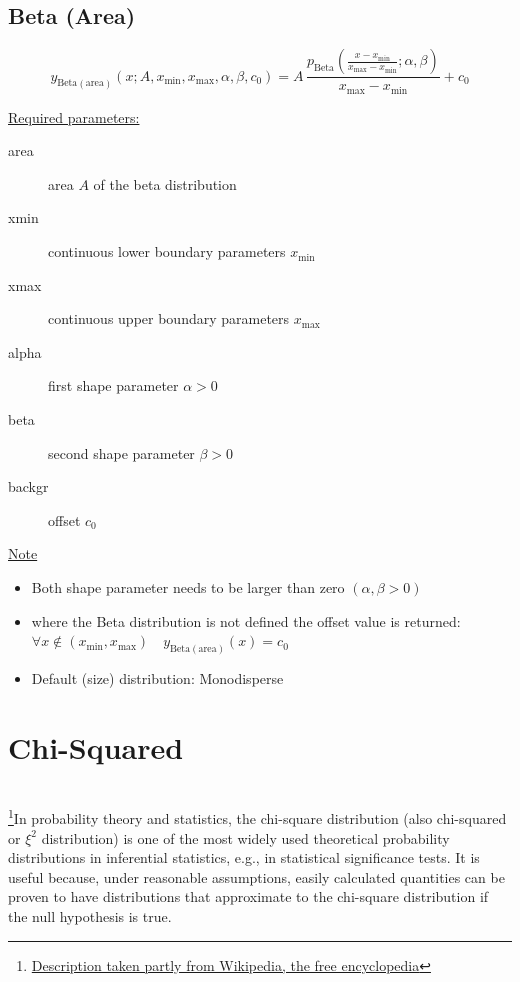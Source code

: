 \subsection{Beta (Area)}\hspace{1pt}
\label{sec:BetaArea}

\begin{equation}
y_\mathrm{Beta (area)}\left(x;A,x_\mathrm{min},x_\mathrm{max},\alpha,\beta,c_0\right)
= A\, \frac{p_\mathrm{Beta}\left(\frac{x-x_\mathrm{min}}{x_\mathrm{max}-x_\mathrm{min}};\alpha,\beta\right)}{x_\mathrm{max}-x_\mathrm{min}}
+c_0
\end{equation}

\underline{Required parameters:}
\begin{description}
    \item[area] area $A$ of the beta distribution
    \item[xmin] continuous lower boundary parameters $x_\mathrm{min}$
    \item[xmax] continuous upper boundary parameters $x_\mathrm{max}$
    \item[alpha] first shape parameter $\alpha>0$
    \item[beta]  second shape parameter $\beta>0$
    \item[backgr] offset $c_0$
\end{description}

\underline{Note}
\begin{itemize}
  \item Both shape parameter needs to be larger than zero $(\alpha,\beta>0)$
  \item where the Beta distribution is not defined the offset value is returned: \\
  $\forall x\notin (x_\mathrm{min},x_\mathrm{max})\quad y_\mathrm{Beta (area)}(x) = c_0$
  \item Default (size) distribution: Monodisperse
\end{itemize}


\clearpage
\section{Chi-Squared} \hspace{1pt} \\
\label{sec:ChiSquared}
\footnote{\href{http://en.wikipedia.org/wiki/Chi-square_distribution}{Description
taken partly from Wikipedia, the free encyclopedia}}In probability
theory and statistics, the chi-square distribution (also chi-squared
or $\xi^2$  distribution) is one of the most widely used theoretical
probability distributions in inferential statistics, e.g., in
statistical significance tests. It is useful because, under
reasonable assumptions, easily calculated quantities can be proven
to have distributions that approximate to the chi-square
distribution if the null hypothesis is true.

